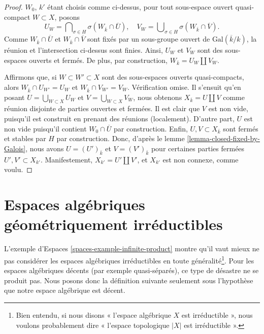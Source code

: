 \begin{proof}
\medskip\noindent
$W_0$, $k'$ étant choisis comme ci-dessus, pour tout sous-espace ouvert quasi-compact
$W \subset X$, posons
$$
U_W =
\bigcap\nolimits_{\sigma \in H} \sigma(W_{\overline{k}} \cap \overline{U}),
\quad
V_W =
\bigcup\nolimits_{\sigma \in H} \sigma(W_{\overline{k}} \cap \overline{V}).
$$
Comme $W_{\overline{k}} \cap \overline{U}$ et
$W_{\overline{k}} \cap \overline{V}$ sont fixés par un sous-groupe ouvert de
$\text{Gal}(\overline{k}/k)$, la réunion et l'intersection
ci-dessus sont finies. Ainsi, $U_W$ et $V_W$ sont des sous-espaces ouverts et fermés.
De plus, par construction, $W_{\bar k} = U_W \amalg V_W$.

\medskip\noindent
Affirmons que, si $W \subset W' \subset X$ sont des sous-espaces ouverts
quasi-compacts, alors $W_{\overline{k}} \cap U_{W'} = U_W$ et
$W_{\overline{k}} \cap V_{W'} = V_W$. Vérification omise.
Il s'ensuit qu'en posant $U = \bigcup_{W \subset X} U_W$
et $V = \bigcup_{W \subset X} V_W$, nous obtenons
$X_{\overline{k}} = U \amalg V$ comme réunion disjointe de parties ouvertes
et fermées.
Il est clair que $V$ est non vide, puisqu'il est construit en prenant des
réunions (localement). D'autre part, $U$ est non vide puisqu'il contient
$W_0 \cap \overline{U}$ par construction. Enfin, $U, V \subset X_{\bar k}$
sont fermés et stables par $H$ par construction. Donc, d'après le
lemme \ref{lemma-closed-fixed-by-Galois},
nous avons $U = (U')_{\bar k}$ et $V = (V')_{\bar k}$ pour certaines
parties fermées $U', V' \subset X_{k'}$. Manifestement, $X_{k'} = U' \amalg V'$,
et $X_{k'}$ est non connexe, comme voulu.
\end{proof}






\section{Espaces algébriques géométriquement irréductibles}
\label{section-geometrically-irreducible}

\noindent
L'exemple d'Espaces \ref{spaces-example-infinite-product} montre qu'il
vaut mieux ne pas considérer les espaces algébriques irréductibles en toute
généralité\footnote{Bien entendu, si nous disons « l'espace algébrique $X$
est irréductible », nous voulons probablement dire « l'espace topologique $|X|$
est irréductible ».}. Pour les espaces algébriques décents (par exemple quasi-séparés),
ce type de désastre ne se produit pas. Nous posons donc la
définition suivante seulement sous l'hypothèse que notre espace algébrique est décent.

